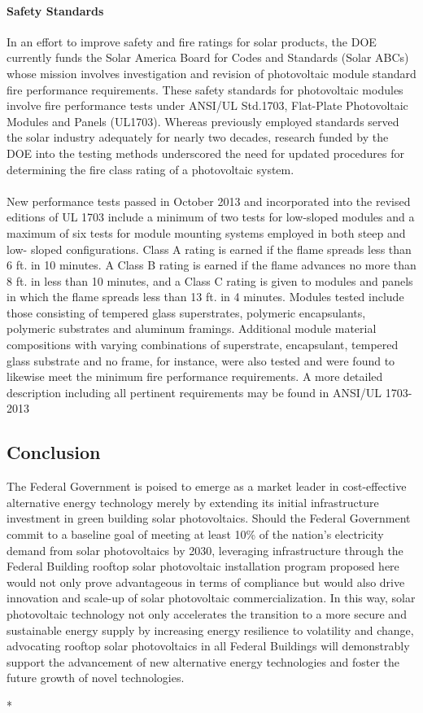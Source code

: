 \paragraph{Safety Standards}
In an effort to improve safety and fire ratings for solar products, the DOE currently funds the Solar America Board for Codes and Standards (Solar ABCs) whose mission involves investigation and revision of photovoltaic module standard fire performance requirements. These safety standards for photovoltaic modules involve fire performance tests under ANSI/UL Std.1703, Flat-Plate Photovoltaic Modules and Panels (UL1703). Whereas previously employed standards served the solar industry adequately for nearly two decades, research funded by the DOE into the testing methods underscored the need for updated procedures for determining the fire class rating of a photovoltaic system.
\\\\
\noindent New performance tests passed in October 2013 and incorporated into the revised editions of UL 1703 include a minimum of two tests for low-sloped modules and a maximum of six tests for module mounting systems employed in both steep and low- sloped configurations. Class A rating is earned if the flame spreads less than 6 ft. in 10 minutes. A Class B rating is earned if the flame advances no more than 8 ft. in less than 10 minutes, and a Class C rating is given to modules and panels in which the flame spreads less than 13 ft. in 4 minutes. Modules tested include those consisting of tempered glass superstrates, polymeric encapsulants, polymeric substrates and aluminum framings. Additional module material compositions with varying combinations of superstrate, encapsulant, tempered glass substrate and no frame, for instance, were also tested and were found to likewise meet the minimum fire performance requirements. A more detailed description including all pertinent requirements may be found in ANSI/UL 1703-2013

\subsection{Conclusion}
The Federal Government is poised to emerge as a market leader in cost-effective alternative energy technology merely by extending its initial infrastructure investment in green building solar photovoltaics. Should the Federal Government commit to a baseline goal of meeting at least 10\% of the nation’s electricity demand from solar photovoltaics by 2030, leveraging infrastructure through the Federal Building rooftop solar photovoltaic installation program proposed here would not only prove advantageous in terms of compliance but would also drive innovation and scale-up of solar photovoltaic commercialization. In this way, solar photovoltaic technology not only accelerates the transition to a more secure and sustainable energy supply by increasing energy resilience to volatility and change, advocating rooftop solar photovoltaics in all Federal Buildings will demonstrably support the advancement of new alternative energy technologies and foster the future growth of novel technologies.

\nocite{julie}{*}

